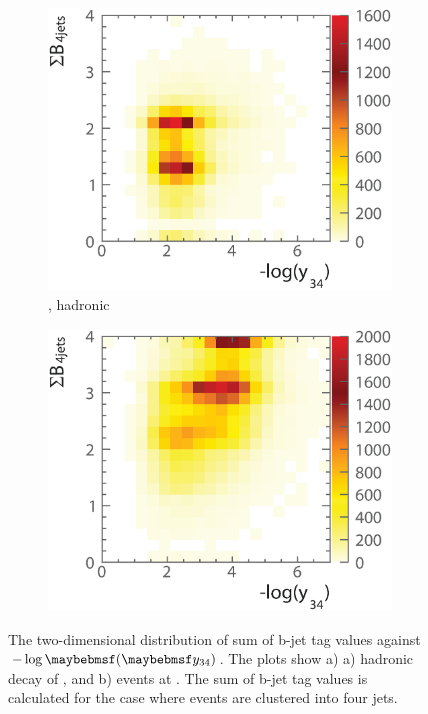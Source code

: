 \begin{figure}[!htbp]
  \begin{subfigure}[b]{0.45\textwidth}
    \includegraphics[width=\textwidth]{doubleHiggs/preSel/mutual6022bbWW2}
    \caption{\eeToHHbbWW, hadronic}
    \label{fig:doubleHiggs1.4MutualbbWW}
  \end{subfigure}
    \begin{subfigure}[b]{0.45\textwidth}
    \includegraphics[width=\textwidth]{doubleHiggs/preSel/mutual6022bbbb2}
    \caption{\eeToHHbbbb}
    \label{fig:doubleHiggs1.4Mutualbbbb}
  \end{subfigure}
\caption[Sum of b-jet tag values as a function of $-\log\parenths{\y{34}}$ at ]%
   {The two-dimensional distribution of sum of b-jet tag values against $-\log\parenths{\y{34}}$. The plots show a)  a) hadronic \WW decay of \eeToHHbbWW, and b) \eeToHHbbbb events at . The sum of b-jet tag values is calculated for the case where events are clustered into four jets.}
   \label{fig:doubleHiggsMutualPreselection}
\end{figure}


